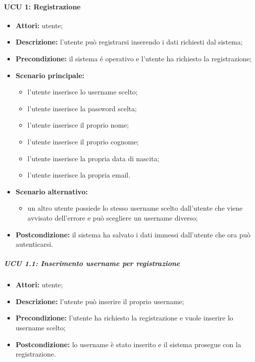 \paragraph{UCU 1: Registrazione}
\begin{itemize}
	\item \textbf{Attori:} utente;
	\item \textbf{Descrizione:} l'utente può registrarsi inserendo i dati richiesti dal sistema;
	\item \textbf{Precondizione:} il sistema é operativo e l'utente ha richiesto la registrazione;
	\item \textbf{Scenario principale:}
	\begin{itemize}
		\item l'utente inserisce lo username scelto;
		\item l'utente inserisce la password scelta;
		\item l'utente inserisce il proprio nome;
		\item l'utente inserisce il proprio cognome;
		\item l'utente inserisce la propria data di nascita;
		\item l'utente inserisce la propria email.
	\end{itemize}
	\item \textbf{Scenario alternativo:}
	\begin{itemize}
		\item un altro utente possiede lo stesso username scelto dall'utente che viene avvisato dell'errore e può scegliere un username diverso;
	\end{itemize}
	\item \textbf{Postcondizione:} il sistema ha salvato i dati immessi dall'utente che ora può autenticarsi.
\end{itemize}

\subparagraph{UCU 1.1: Inserimento username per registrazione}
\begin{itemize}
	\item \textbf{Attori:} utente;
	\item \textbf{Descrizione:} l'utente può inserire il proprio username;
	\item \textbf{Precondizione:} l'utente ha richiesto la registrazione e vuole inserire lo username scelto;
	\item \textbf{Postcondizione:} lo username è stato inserito e il sistema prosegue con la registrazione.
\end{itemize}

